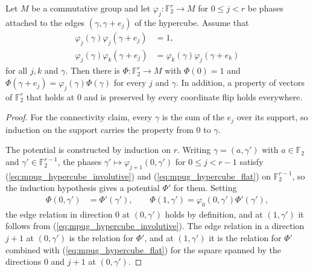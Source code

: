 \begin{lemma}
    \label{thm:mpug_hypercube_potential}
    \leanok
    Let $M$ be a commutative group and let
    $\varphi_j\colon\mathbb F_2^r\to M$ for $0\leq j<r$ be phases attached
    to the edges $(\gamma,\gamma+e_j)$ of the hypercube. Assume that
    \begin{align}
        \varphi_j(\gamma)\varphi_j(\gamma+e_j)
         & =1,
        \label{eq:mpug_hypercube_involutive}       \\
        \varphi_j(\gamma)\varphi_k(\gamma+e_j)
         & =\varphi_k(\gamma)\varphi_j(\gamma+e_k)
        \label{eq:mpug_hypercube_flat}
    \end{align}
    for all $j,k$ and $\gamma$. Then there is $\Phi\colon\mathbb F_2^r\to M$
    with $\Phi(0)=1$ and $\Phi(\gamma+e_j)=\varphi_j(\gamma)\Phi(\gamma)$ for
    every $j$ and $\gamma$. In addition, a property of vectors of
    $\mathbb F_2^r$ that holds at $0$ and is preserved by every coordinate
    flip holds everywhere.
\end{lemma}

\begin{proof}\leanok
    For the connectivity claim, every $\gamma$ is the sum of the $e_j$ over
    its support, so induction on the support carries the property from $0$ to
    $\gamma$.

    The potential is constructed by induction on $r$. Writing
    $\gamma=(a,\gamma')$ with $a\in\mathbb F_2$ and
    $\gamma'\in\mathbb F_2^{r-1}$, the phases
    $\gamma'\mapsto\varphi_{j+1}(0,\gamma')$ for $0\leq j<r-1$ satisfy
    (\ref{eq:mpug_hypercube_involutive}) and (\ref{eq:mpug_hypercube_flat})
    on $\mathbb F_2^{r-1}$, so the induction hypothesis gives a potential
    $\Phi'$ for them. Setting
    \begin{align}
        \Phi(0,\gamma') & =\Phi'(\gamma'),
        \qquad
        \Phi(1,\gamma')=\varphi_0(0,\gamma')\Phi'(\gamma'),
        \label{eq:mpug_hypercube_potential_step}
    \end{align}
    the edge relation in direction $0$ at $(0,\gamma')$ holds by definition,
    and at $(1,\gamma')$ it follows from
    (\ref{eq:mpug_hypercube_involutive}). The edge relation in a direction
    $j+1$ at $(0,\gamma')$ is the relation for $\Phi'$, and at $(1,\gamma')$
    it is the relation for $\Phi'$ combined with
    (\ref{eq:mpug_hypercube_flat}) for the square spanned by the directions
    $0$ and $j+1$ at $(0,\gamma')$.
\end{proof}

